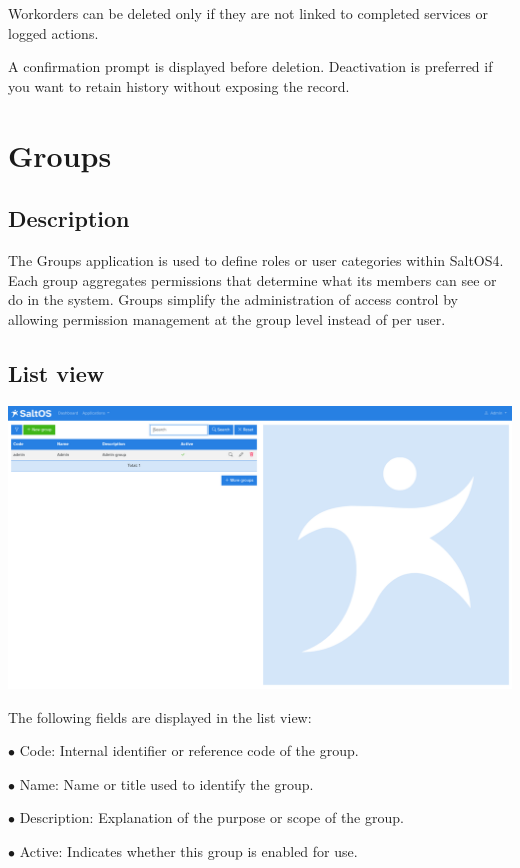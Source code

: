 \documentclass[a4paper]{article}
\begin{document}
Workorders can be deleted only if they are not linked to completed services or logged actions.

A confirmation prompt is displayed before deletion.
Deactivation is preferred if you want to retain history without exposing the record.


\hypertarget{toc176}{}
\section{Groups}

\hypertarget{toc177}{}
\subsection{Description}

The Groups application is used to define roles or user categories within SaltOS4.
Each group aggregates permissions that determine what its members can see or do in the system.
Groups simplify the administration of access control by allowing permission management at the group level instead of per user.

\hypertarget{toc178}{}
\subsection{List view}

\begin{center}\includegraphics[width=1\textwidth]{../ujest/snaps/test-screenshots-js-screenshots-users-groups-list-en-us-1-snap.png}\end{center}

The following fields are displayed in the list view:

\begin{compactitem}
\item[\color{myblue}$\bullet$] Code: Internal identifier or reference code of the group.
\item[\color{myblue}$\bullet$] Name: Name or title used to identify the group.
\item[\color{myblue}$\bullet$] Description: Explanation of the purpose or scope of the group.
\item[\color{myblue}$\bullet$] Active: Indicates whether this group is enabled for use.
\end{compactitem}
\end{document}
